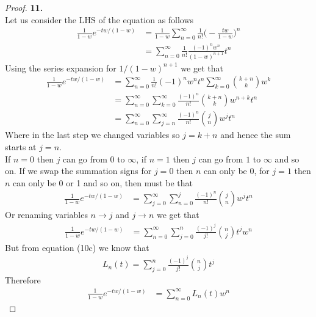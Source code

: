 \documentclass[11pt]{article}
\theoremstyle{definition}
\begin{document}
\cleardoublepage
\begin{proof}{\textbf{11.}}\\
Let us consider the LHS of the equation as follows
\begin{align*}
    \frac{1}{1 - w} e^{-tw/(1-w)}
    &= \frac{1}{1 - w}\sum_{n=0}^\infty \frac{1}{n!}\bigg(-\frac{tw}{1-w}\bigg)^n\\
    &= \sum_{n=0}^\infty \frac{1}{n!}\frac{(-1)^nw^n}{(1-w)^{n+1}}t^n
\end{align*}
Using the series expansion for $1/(1-w)^{n+1}$ we get that
\begin{align*}
    \frac{1}{1 - w} e^{-tw/(1-w)}
    &= \sum_{n=0}^\infty \frac{1}{n!}(-1)^nw^n t^n
    \sum_{k=0}^\infty\binom{k+n}{k} w^{k}\\
    &= \sum_{n=0}^\infty \sum_{k=0}^\infty
    \frac{(-1)^n}{n!}\binom{k+n}{k} w^{n+k}t^n\\
    &= \sum_{n=0}^\infty \sum_{j=n}^\infty
    \frac{(-1)^n}{n!}\binom{j}{n} w^{j}t^n
\end{align*}
Where in the last step we changed variables so $j = k + n$ and hence the sum
starts at $j = n$.\\
If $n = 0$ then $j$ can go from 0 to $\infty$, if $n = 1$ then $j$ can go from
$1$ to $\infty$ and so on. If we swap the summation signs for $j = 0$ then
$n$ can only be 0, for $j = 1$ then $n$ can only be 0 or 1 and so on, then
must be that
\begin{align*}
    \frac{1}{1 - w} e^{-tw/(1-w)}
    &= \sum_{j=0}^\infty \sum_{n=0}^j
    \frac{(-1)^n}{n!}\binom{j}{n} w^{j}t^n
\end{align*}
Or renaming variables $n \to j$ and $j \to n$ we get that
\begin{align*}
    \frac{1}{1 - w} e^{-tw/(1-w)}
    &= \sum_{n=0}^\infty \sum_{j=0}^n
    \frac{(-1)^j}{j!}\binom{n}{j} t^j w^{n}
\end{align*}
But from equation (10c) we know that
\begin{align*}
    L_n(t) = \sum_{j=0}^n \frac{(-1)^j}{j!} \binom{n}{j}t^j
\end{align*}
Therefore
\begin{align*}
    \frac{1}{1 - w} e^{-tw/(1-w)}
    &= \sum_{n=0}^\infty L_n(t) w^{n}
\end{align*}
\end{proof}
\end{document}
